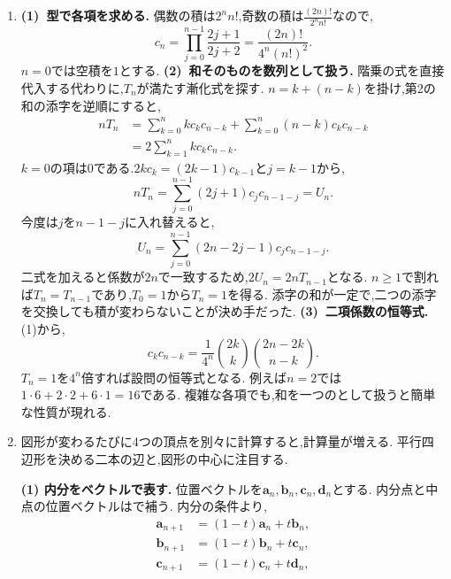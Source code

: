 \begin{enumerate}[label=\textbf{問\arabic*.},leftmargin=3.8em,format=\bookitemlink{practice-entrance}{solution}{problem}]
\[    \]
    となる.$j<s$では奇数,$j=s$では偶数なので連続する奇数項は$s$個である.
    例えば$a_0=7$では$7,11,17,26,\ldots$となる.
    最初の奇数区間の長さは,$a_0+1$に含まれる$2$の因子で決まる.
  \item \textbf{(1)~型で各項を求める.}
    偶数の積は$2^nn!$,奇数の積は$\frac{(2n)!}{2^nn!}$なので,
    \[
      c_n=\prod_{j=0}^{n-1}\frac{2j+1}{2j+2}
      =\frac{(2n)!}{4^n(n!)^2}.
    \]
    $n=0$では空積を$1$とする.
    \smallskip\textbf{(2)~和そのものを数列として扱う.}
    階乗の式を直接代入する代わりに,$T_n$が満たす漸化式を探す.
    $n=k+(n-k)$を掛け,第2の和の添字を逆順にすると,
    \[
      \begin{aligned}
        nT_n&=\sum_{k=0}^n kc_kc_{n-k}
        +\sum_{k=0}^n(n-k)c_kc_{n-k}\\
        &=2\sum_{k=1}^n kc_kc_{n-k}.
      \end{aligned}
    \]
    $k=0$の項は0である.$2kc_k=(2k-1)c_{k-1}$と$j=k-1$から,
    \[
      nT_n=\sum_{j=0}^{n-1}(2j+1)c_jc_{n-1-j}=U_n.
    \]
    今度は$j$を$n-1-j$に入れ替えると,
    \[
      U_n=\sum_{j=0}^{n-1}(2n-2j-1)c_jc_{n-1-j}.
    \]
    二式を加えると係数が$2n$で一致するため,$2U_n=2nT_{n-1}$となる.
    $n\ge1$で割れば$T_n=T_{n-1}$であり,$T_0=1$から$T_n=1$を得る.
    添字の和が一定で,二つの添字を交換しても積が変わらないことが決め手だった.
    \smallskip\textbf{(3)~二項係数の恒等式.}
    (1)から,
    \[
      c_kc_{n-k}=\frac1{4^n}\binom{2k}{k}
      \binom{2n-2k}{n-k}.
    \]
    $T_n=1$を$4^n$倍すれば設問の恒等式となる.
    例えば$n=2$では$1\cdot6+2\cdot2+6\cdot1=16$である.
    複雑な各項でも,和を一つのとして扱うと簡単な性質が現れる.
  \item 図形が変わるたびに4つの頂点を別々に計算すると,計算量が増える.
    平行四辺形を決める二本の辺と,図形の中心に注目する.
    \par\noindent
    \textbf{(1) 内分をベクトルで表す.}
    位置ベクトルを$\boldsymbol a_n,\boldsymbol b_n,
      \boldsymbol c_n,\boldsymbol d_n$とする.
    内分点と中点の位置ベクトルはで補う.
    内分の条件より,
    \[
      \begin{aligned}
        \boldsymbol a_{n+1}&=(1-t)\boldsymbol a_n+t\boldsymbol b_n,\\
        \boldsymbol b_{n+1}&=(1-t)\boldsymbol b_n+t\boldsymbol c_n,\\
        \boldsymbol c_{n+1}&=(1-t)\boldsymbol c_n+t\boldsymbol d_n,\\

\end{aligned}\]
\end{enumerate}
